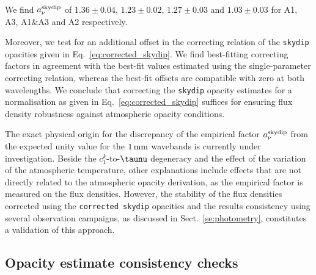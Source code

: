 We find $a_\nu^{\rm{skydip}}$ of
$1.36 \pm 0.04$,
$1.23 \pm 0.02$,
$1.27 \pm 0.03$ and
$1.03 \pm 0.03$ for A1, A3, A1$\&$A3 and A2 respectively.

Moreover, we test for an additional offset in the
correcting relation of the {\tt skydip} opacities given in
Eq.~\ref{eq:corrected_skydip}. We find best-fitting correcting factors
in agreement with the best-fit values estimated using the single-parameter
correcting relation, whereas the best-fit offsets are compatible with
zero at both wavelengths. We conclude that correcting the {\tt skydip}
opacity estimates for a normalisation as given in
Eq.~\ref{eq:corrected_skydip} suffices for ensuring flux density
robustness against atmospheric opacity conditions.

The exact physical origin for the discrepancy of the empirical factor
$a_\nu^{\rm{skydip}}$ from the expected unity value {\lp for the
$1\,\rm{mm}$ wavebands} is currently under investigation.
{\rev Beside the $c_1^k$-to-$\taunu$ degeneracy and the effect
of the variation of the atmospheric temperature, other explanations
include effects that are not directly related to the atmospheric
opacity derivation, as the empirical factor is measured on the flux
densities.} 
However, the stability of the flux densities corrected using the
{\tt corrected skydip} opacities {\lp and the results consistency using
several observation campaigns}, as discussed in
Sect.~\ref{se:photometry}, constitutes a validation of this approach.


\subsection{Opacity estimate consistency checks}
\label{se:opacity_tests}

